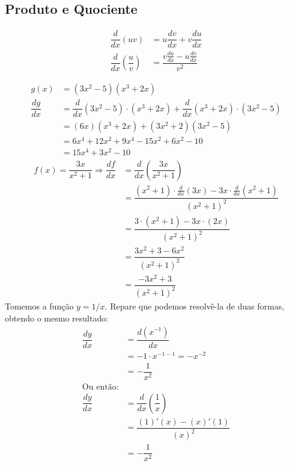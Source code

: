 \subsection{Produto e Quociente}
\begin{align*}
\dfrac{d}{dx}(uv)&=u\dfrac{dv}{dx}+v\dfrac{du}{dx}\\
\dfrac{d}{dx}\left(\dfrac{u}{v}\right)&=\dfrac{v\frac{du}{dx}-u\frac{dv}{dx}}{v^2}
\end{align*}
\begin{exemplo}
\begin{align*}
g(x)&=(3x^2-5)(x^3+2x) \\ \dfrac{dg}{dx} &=\dfrac{d}{dx}(3x^2-5)\cdot (x^3+2x) + \dfrac{d}{dx}(x^3+2x) \cdot (3x^2-5) \\
&=(6x)(x^3+2x)+(3x^2+2)(3x^2-5) \\
&= 6x^4+12x^2+9x^4-15x^2+6x^2-10 \\
&= 15x^4+3x^2-10
\end{align*}
\begin{align*}
f(x)=\dfrac{3x}{x^2+1} \Rightarrow \dfrac{df}{dx}&=\dfrac{d}{dx}\left(\dfrac{3x}{x^2+1}\right)\\
&=\dfrac{(x^2+1)\cdot\frac{d}{dx}(3x)-3x\cdot\frac{d}{dx}(x^2+1)}{(x^2+1)^2}\\
&=\dfrac{3\cdot(x^2+1)-3x\cdot(2x)}{(x^2+1)^2} \\
&=\dfrac{3x^2+3-6x^2}{(x^2+1)^2} \\
&=\dfrac{-3x^2+3}{(x^2+1)^2}
\end{align*}
Tomemos a função $y=1/x$. Repare que podemos resolvê-la de duas formas, obtendo o mesmo resultado:
\begin{align*}
\dfrac{dy}{dx}&=\dfrac{d(x^{-1})}{dx}\\ &=-1\cdot x^{-1-1}=-x^{-2}\\ &=-\dfrac{1}{x^2} \\
\textrm{Ou então:}\\
\dfrac{dy}{dx}&=\dfrac{d}{dx}\left(\dfrac{1}{x}\right)\\
&=\dfrac{(1)'(x)-(x)'(1)}{(x)^2}\\
&=-\dfrac{1}{x^2}
\end{align*}
\end{exemplo}

